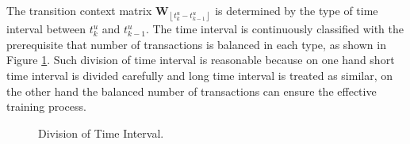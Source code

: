 \documentclass[conference]{IEEEtran}
\begin{document}
The transition context matrix $\textbf{W}_{\left\lfloor t_k^u-t_{k-1}^u \right\rfloor }$ is determined by the type of time interval between $t_k^u$ and $t_{k-1}^u$. The time interval is continuously classified with the prerequisite that number of transactions is balanced in each type, as shown in Figure \ref{fig:comparision}. Such division of time interval is reasonable because on one hand short time interval is divided carefully and long time interval is treated as similar, on the other hand the balanced number of transactions can ensure the effective training process.
\begin{figure}[!tb]
\centering
{}
\hspace{-1mm}
\caption{Division of Time Interval.}
\label{fig:comparision}
\end{figure}
\end{document}
